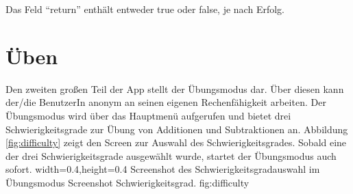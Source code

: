 Das Feld \enquote{return} enthält entweder true oder false, je nach Erfolg.


\section{Üben}
\label{sec:excercise}

Den zweiten großen Teil der App stellt der Übungsmodus dar. Über diesen kann der/die BenutzerIn 
anonym an seinen eigenen Rechenfähigkeit arbeiten. Der Übungsmodus wird über das Hauptmenü aufgerufen 
und bietet drei Schwierigkeitsgrade zur Übung von Additionen und Subtraktionen an. 
Abbildung \ref{fig:difficulty} zeigt den Screen zur Auswahl des Schwierigkeitsgrades. Sobald eine 
der drei Schwierigkeitsgrade ausgewählt wurde, startet der Übungsmodus auch sofort.
  {width=0.4\textwidth,height=0.4\textheight}%
  {Screenshot des Schwierigkeitsgradauswahl im Übungsmodus}%
  {Screenshot Schwierigkeitsgrad.}%
  {fig:difficulty}%

